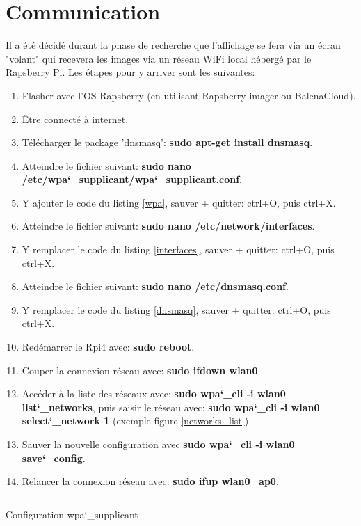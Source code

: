 \section{Communication}
Il a été décidé durant la phase de recherche que l'affichage se fera via un écran "volant" qui recevera les images via un réseau WiFi local
hébergé par le Rapsberry Pi. Les étapes pour y arriver sont les suivantes:
\begin{enumerate}
    \item Flasher avec l'OS Rapsberry (en utilisant Rapsberry imager ou BalenaCloud).
    \item Être connecté à internet.
    \item Télécharger le package 'dnsmasq': \textbf{sudo apt-get install dnsmasq}.
    \item Atteindre le fichier suivant: \textbf{sudo nano /etc/wpa\char`_supplicant/wpa\char`_supplicant.conf}.
    \item Y ajouter le code du listing \ref{wpa}, sauver + quitter: ctrl+O, puis ctrl+X.
    \item Atteindre le fichier suivant: \textbf{sudo nano /etc/network/interfaces}.
    \item Y remplacer le code du listing \ref{interfaces}, sauver + quitter: ctrl+O, puis ctrl+X.
    \item Atteindre le fichier suivant: \textbf{sudo nano /etc/dnsmasq.conf}.
    \item Y remplacer le code du listing \ref{dnsmasq}, sauver + quitter: ctrl+O, puis ctrl+X.
    \item Redémarrer le Rpi4 avec: \textbf{sudo reboot}.
    \item Couper la connexion réseau avec: \textbf{sudo ifdown wlan0}.
    \item Accéder à la liste des réseaux avec: \textbf{sudo wpa\char`_cli -i wlan0 list\char`_networks}, puis saisir le réseau avec: \textbf{sudo wpa\char`_cli -i wlan0 select\char`_network 1} (exemple figure \ref{networks_list})
    \item Sauver la nouvelle configuration avec \textbf{sudo wpa\char`_cli -i wlan0 save\char`_config}.
    \item Relancer la connexion réseau avec: \textbf{sudo ifup \underline{wlan0=ap0}}.
\end{enumerate}
\begin{listing}[ht]
    \inputminted{makefile}{assets/figures/wpa_supplicant.make}
    \caption{Configuration wpa\char`_supplicant \label{wpa}}
\end{listing}

